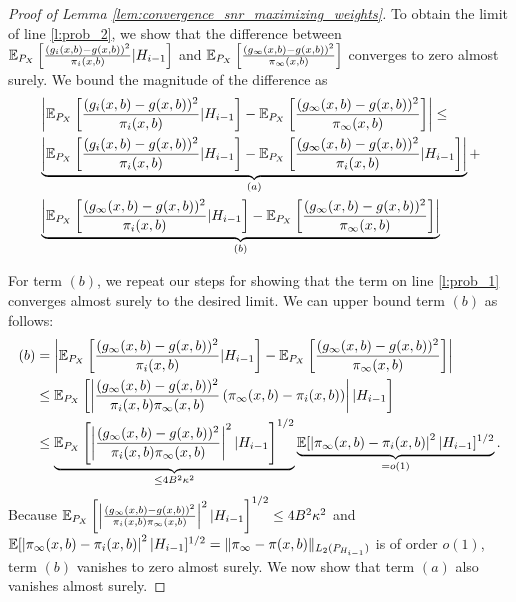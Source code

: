 \documentclass{article}
\begin{document}
\begin{appendices}
\begin{proof}[Proof of Lemma \ref{lem:convergence_snr_maximizing_weights}]
To obtain the limit of line \eqref{l:prob_2}, we show that the difference between $\mathbb{E}_{P_X}\left[ \frac{(g_i(x,b) - g(x,b))^2}{\pi_i(x,b)} | H_{i-1} \right]$ and $\mathbb{E}_{P_X}\left[ \frac{(g_\infty(x,b) - g(x,b))^2}{\pi_\infty(x,b)}\right]$ converges to zero almost surely. We bound the magnitude of the difference as  
\begin{align}
    &\left|\mathbb{E}_{P_X}\left[ \frac{(g_i(x,b) - g(x,b))^2}{\pi_i(x,b)} | H_{i-1} \right] - \mathbb{E}_{P_X}\left[ \frac{(g_\infty(x,b) - g(x,b))^2}{\pi_\infty(x,b)}\right]\right| \leq \\
    & \underbrace{\left|\mathbb{E}_{P_X}\left[ \frac{(g_i(x,b) - g(x,b))^2}{\pi_i(x,b)} | H_{i-1} \right] - \mathbb{E}_{P_X}\left[ \frac{(g_\infty(x,b) - g(x,b))^2}{\pi_i(x,b)} | H_{i-1}\right]\right|}_{(a)}\label{l:subprob_1} + \\
    & \underbrace{\left|\mathbb{E}_{P_X}\left[ \frac{(g_\infty(x,b) - g(x,b))^2}{\pi_i(x,b)} | H_{i-1} \right] - \mathbb{E}_{P_X}\left[ \frac{(g_\infty(x,b) - g(x,b))^2}{\pi_\infty(x,b)} \right]\right|}_{(b)}\label{l:subprob_2}
\end{align}

For term $(b)$, we repeat our steps for showing that the term on line \eqref{l:prob_1} converges almost surely to the desired limit. We can upper bound term $(b)$ as follows:
\begin{align}
    (b) &= \left|\mathbb{E}_{P_X}\left[ \frac{(g_\infty(x,b) - g(x,b))^2}{\pi_i(x,b)} | H_{i-1} \right] - \mathbb{E}_{P_X}\left[ \frac{(g_\infty(x,b) - g(x,b))^2}{\pi_\infty(x,b)} \right]\right| \\
    &\leq \mathbb{E}_{P_X}\left[\left| \frac{(g_\infty(x,b) - g(x,b))^2}{\pi_i(x,b)\pi_\infty(x,b)} \left(\pi_\infty(x,b) - \pi_i(x,b)\right) \right| | H_{i-1} \right] \\
    &\leq \underbrace{\mathbb{E}_{P_X}\left[\left| \frac{(g_\infty(x,b) - g(x,b))^2}{\pi_i(x,b)\pi_\infty(x,b)}  \right|^2 | H_{i-1} \right]^{1/2}}_{\leq 4B^2\kappa^2} \underbrace{\mathbb{E}[\left|\pi_\infty(x,b) - \pi_i(x,b)\right|^2 | H_{i-1}]^{1/2}}_{=o(1)}.
\end{align}
Because $\mathbb{E}_{P_X}\left[\left| \frac{(g_\infty(x,b) - g(x,b))^2}{\pi_i(x,b)\pi_\infty(x,b)}  \right|^2 | H_{i-1} \right]^{1/2} \leq 4B^2\kappa^2$ and $\mathbb{E}[\left|\pi_\infty(x,b) - \pi_i(x,b)\right|^2 | H_{i-1}]^{1/2} = \| \pi_\infty - \pi(x,b) \|_{L_2(P_{H_{i-1}})}$ is of order $o(1)$, term $(b)$ vanishes to zero almost surely. We now show that term $(a)$ also vanishes almost surely.   


\end{proof}
\end{appendices}
\end{document}
